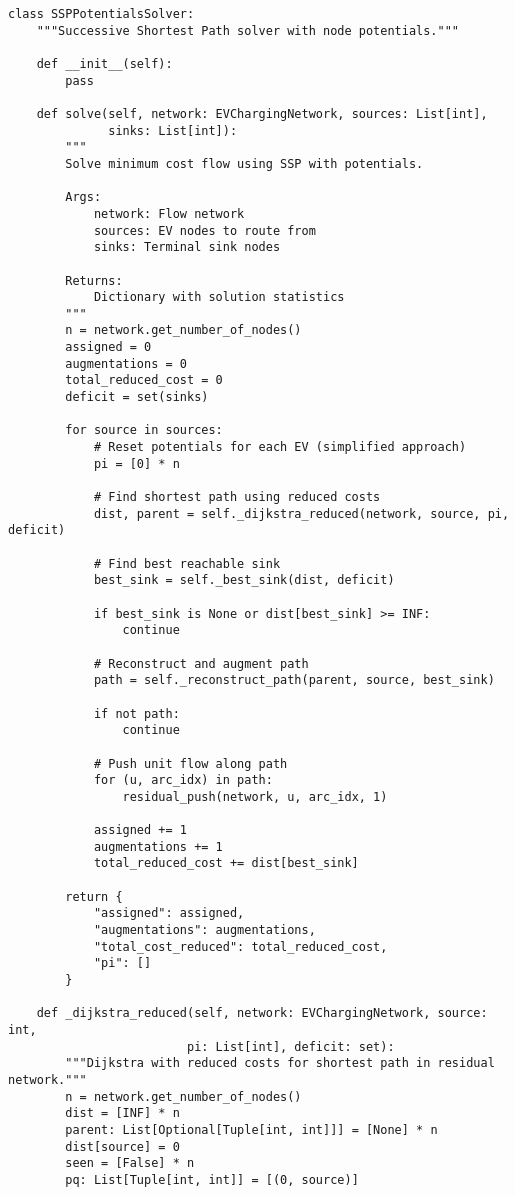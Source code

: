 \documentclass[12pt,a4paper]{article}
\begin{document}
\begin{lstlisting}[caption=SSP Algorithm with Potentials]
class SSPPotentialsSolver:
    """Successive Shortest Path solver with node potentials."""
    
    def __init__(self):
        pass
    
    def solve(self, network: EVChargingNetwork, sources: List[int], 
              sinks: List[int]):
        """
        Solve minimum cost flow using SSP with potentials.
        
        Args:
            network: Flow network
            sources: EV nodes to route from
            sinks: Terminal sink nodes
        
        Returns:
            Dictionary with solution statistics
        """
        n = network.get_number_of_nodes()
        assigned = 0
        augmentations = 0
        total_reduced_cost = 0
        deficit = set(sinks)
        
        for source in sources:
            # Reset potentials for each EV (simplified approach)
            pi = [0] * n
            
            # Find shortest path using reduced costs
            dist, parent = self._dijkstra_reduced(network, source, pi, deficit)
            
            # Find best reachable sink
            best_sink = self._best_sink(dist, deficit)
            
            if best_sink is None or dist[best_sink] >= INF:
                continue
            
            # Reconstruct and augment path
            path = self._reconstruct_path(parent, source, best_sink)
            
            if not path:
                continue
            
            # Push unit flow along path
            for (u, arc_idx) in path:
                residual_push(network, u, arc_idx, 1)
            
            assigned += 1
            augmentations += 1
            total_reduced_cost += dist[best_sink]
        
        return {
            "assigned": assigned,
            "augmentations": augmentations,
            "total_cost_reduced": total_reduced_cost,
            "pi": []
        }
    
    def _dijkstra_reduced(self, network: EVChargingNetwork, source: int,
                         pi: List[int], deficit: set):
        """Dijkstra with reduced costs for shortest path in residual network."""
        n = network.get_number_of_nodes()
        dist = [INF] * n
        parent: List[Optional[Tuple[int, int]]] = [None] * n
        dist[source] = 0
        seen = [False] * n
        pq: List[Tuple[int, int]] = [(0, source)]
        

\end{lstlisting}
\end{document}
